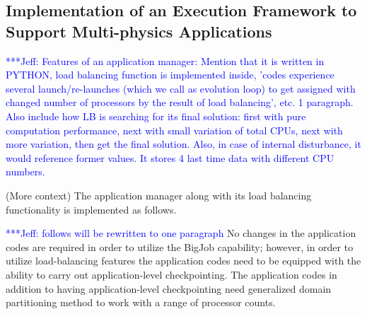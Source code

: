 \documentclass[conference,final]{IEEEtran}
\newcommand{\skonote}[1]{ {\textcolor{blue} { ***Jeff: #1 }}}
\newcommand{\skonote}[1]{}
\begin{document}



\subsection{Implementation of an Execution Framework to Support Multi-physics Applications}

\skonote{Features of an application manager: Mention that it is written in PYTHON, load balancing function is implemented inside, 'codes experience several launch/re-launches (which we call as evolution loop) to get assigned with changed number of processors by the result of load balancing', etc. 1 paragraph. Also include how LB is searching for its final solution: first with pure computation performance, next with small variation of total CPUs, next with more variation, then get the final solution. Also, in case of internal disturbance, it would reference former values. It stores 4 last time data with different CPU numbers.}

(More context) The application manager along with its load balancing functionality is implemented as follows.
\newline

\skonote{follows will be rewritten to one paragraph}
No changes in the application codes are required in order to utilize the BigJob capability; however, in order to utilize load-balancing features the application codes need to be equipped with the ability to carry out application-level checkpointing.  The application codes in addition to having application-level checkpointing need generalized domain partitioning method to work with a range of processor counts. %
\end{document}
